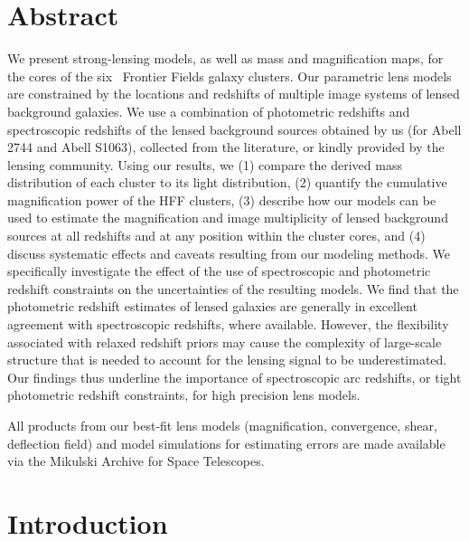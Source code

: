\section{Abstract}

We present strong-lensing models, as well as mass and magnification maps, for the cores of the six \hst\ Frontier Fields galaxy clusters. Our parametric lens models are constrained by the locations and redshifts of multiple image systems of lensed background galaxies. We use a combination of photometric redshifts and spectroscopic redshifts of the lensed background sources obtained by us (for Abell 2744 and Abell S1063), collected from the literature, or kindly provided by the lensing community. Using our results, we (1) compare the derived mass distribution of each cluster to its light distribution, (2) quantify the cumulative magnification power of the HFF clusters, (3) describe how our models can be used to estimate the magnification and image multiplicity of lensed background sources at all redshifts and at any position within the cluster cores, and (4) discuss systematic effects and caveats resulting from our modeling methods. We specifically investigate the effect of the use of spectroscopic and photometric redshift constraints on the uncertainties of the resulting models. We find that the photometric redshift estimates of lensed galaxies are generally in excellent agreement with spectroscopic redshifts, where available. However, the flexibility associated with relaxed redshift priors may cause the complexity of large-scale structure that is needed to account for the lensing signal to be underestimated. Our findings thus underline the importance of spectroscopic arc redshifts, or tight photometric redshift constraints, for high precision lens models.

All products from our best-fit lens models (magnification, convergence, shear, deflection field) and model simulations for estimating errors are made available via the Mikulski Archive for Space Telescopes. 

\section{Introduction}

